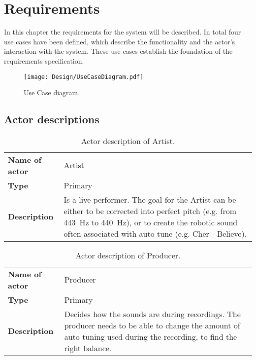 
\chapter{Requirements}

In this chapter the requirements for the system will be described.
In total four use cases have been defined, which describe the functionality and the actor's interaction with the \systemName system.
These use cases establish the foundation of the requirements specification.

\begin{figure}[H]
	\centering
	\texttt{[image: Design/UseCaseDiagram.pdf]}
	\caption{Use Case diagram.}
	\label{fig:UCDiagram}
\end{figure}

\section{Actor descriptions}

\begin{table}[H]
	\centering
	\begin{tabularx}{\textwidth}{p{} X}
		\toprule
		\textbf{Name of actor} & Artist \\
		\textbf{Type} & Primary \\
		\textbf{Description} & Is a live performer.
		The goal for the Artist can be either to be corrected into perfect pitch (e.g. from \SI{443}{\hertz} to \SI{440}{\hertz}), or to create the robotic sound often associated with auto tune (e.g. Cher - Believe). \\
		\bottomrule
	\end{tabularx}
	\caption{Actor description of Artist.}
	\label{tab:actorArtist}
\end{table}

\begin{table}[H]
	\centering
	\begin{tabularx}{\textwidth}{p{} X}
		\toprule
		\textbf{Name of actor} & Producer \\
		\textbf{Type} & Primary \\
		\textbf{Description} & Decides how the sounds are during recordings. The producer needs to be able to change the amount of auto tuning used during the recording, to find the right balance. \\
		\bottomrule
	\end{tabularx}
	\caption{Actor description of Producer.}
	\label{tab:actorProducer}
\end{table}

